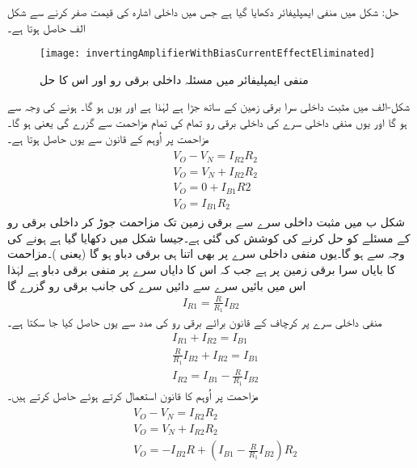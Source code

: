 حل:	شکل  میں منفی ایمپلیفائر دکھایا گیا ہے جس میں داخلی اشارہ کی قیمت صفر کرنے سے شکل   الف حاصل ہوتا ہے۔
\begin{figure}
\centering
\texttt{[image: invertingAmplifierWithBiasCurrentEffectEliminated]}
\caption{منفی ایمپلیفائر میں مسئلہ داخلی برقی رو اور اس کا حل}
\label{شکل_منفی_ایمپلیفائر_اور_داخلی_برقی_رو_کا_مسئلہ}
\end{figure}
شکل-الف میں مثبت داخلی سرا  برقی زمین کے ساتھ جڑا ہے لہٰذا  ہے اور یوں  ہو گا۔ ہونے کی وجہ سے ہو گا اور یوں منفی داخلی سرے  کی داخلی برقی رو تمام کی تمام مزاحمت  سے گزرے گی یعنی ہو گا۔مزاحمت  پر اُوہم کے قانون سے  یوں حاصل ہوتا ہے۔
\begin{gather} \label{مساوات_انحرافی_دباو_کا_خاتمہ_ب}
\begin{aligned}
& V_O-V_N=I_{R2}R_2\\
& V_O =V_N +I_{R2}R_2\\
& V_O = 0 +I_{B1}R2\\
& V_O=I_{B1} R_2
\end{aligned}
\end{gather}
شکل  ب میں مثبت داخلی سرے  سے برقی زمین تک مزاحمت  جوڑ کر داخلی برقی رو کے مسئلے کو حل کرنے کی کوشش کی گئی ہے۔جیسا شکل میں دکھایا گیا ہے  ہونے کی وجہ سے  ہو گا۔یوں منفی داخلی سرے  پر بھی اتنا ہی برقی دباو ہو گا (یعنی )۔مزاحمت  کا بایاں سرا برقی زمین پر ہے جب کہ اس کا دایاں سرے پر منفی برقی دباو ہے لہٰذا اس میں بائیں سرے سے دائیں سرے کی جانب برقی رو گزرے گا
\begin{align*}
I_{R1}=\frac{R}{R_1}I_{B2}
\end{align*}
 منفی داخلی سرے  پر کرچاف کے قانون برائے برقی رو کی مدد سے  یوں حاصل کیا جا سکتا ہے۔
\begin{align*}
&I_{R1}+I_{R2}=I_{B1}\\
&\frac{R}{R_1}I_{B2}+I_{R2}=I_{B1}\\
&I_{R2}=I_{B1}-\frac{R}{R_1}I_{B2}
\end{align*}
مزاحمت  پر اُوہم کا قانون استعمال کرتے ہوئے  حاصل کرتے ہیں۔
\begin{gather} \label{مساوات_انحرافی_دباو_کا_خاتمہ_الف}
\begin{aligned}
& V_O-V_N=I_{R2}R_2\\
& V_O=V_N+I_{R2}R_2\\
& V_O=-I_{B2}R+\left (I_{B1}-\frac{R}{R_1}I_{B2} \right ) R_2
\end{aligned}
\end{gather}
